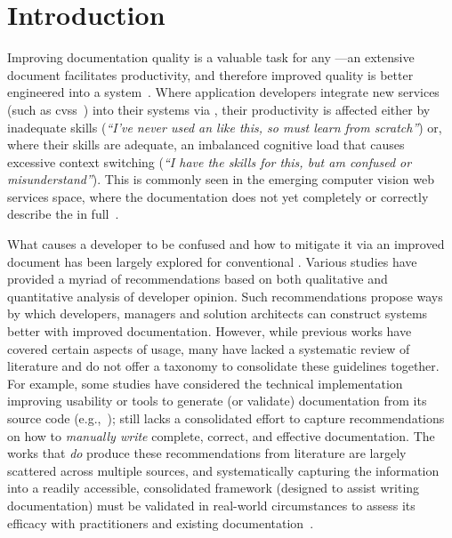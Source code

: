 \section{Introduction}

Improving  documentation quality is a valuable task for any ---an extensive  document facilitates productivity, and therefore improved quality is better engineered into a system~\citep{mcleod2011factors}. Where application developers integrate new services (such as \glspl{cvs}~\citep{Cummaudo:2019icsme}) into their systems via , their productivity is affected either by inadequate skills (\textit{``I've never used an  like this, so must learn from scratch''}) or, where their skills are adequate, an imbalanced cognitive load that causes excessive context switching (\textit{``I have the skills for this, but am confused or misunderstand''}). This is commonly seen in the emerging computer vision web services space, where the documentation does not yet completely or correctly describe the  in full~\citep{Cummaudo:2020icse}. 

What causes a developer to be confused and how to mitigate it via an improved  document has been largely explored for conventional . Various studies have provided a myriad of recommendations based on both qualitative and quantitative analysis of developer opinion. Such recommendations propose ways by which developers, managers and solution architects can construct systems better with improved documentation. However, while previous works have covered certain aspects of  usage, many have lacked a systematic review of literature and do not offer a taxonomy to consolidate these guidelines together. For example, some studies have considered the technical implementation improving  usability or tools to generate (or validate)  documentation from its source code (e.g.,~\citep{Nybom:2018ef,Watson:2012uy,Maalej2013}); still lacks a consolidated effort to capture recommendations on how to \textit{manually write} complete, correct, and effective  documentation. The works that \textit{do} produce these recommendations from literature are largely scattered across multiple sources, and systematically capturing the information into a readily accessible, consolidated framework (designed to assist writing  documentation) must be validated in real-world circumstances to assess its efficacy with practitioners and existing documentation~\citep{Cummaudo:2019esem}.

